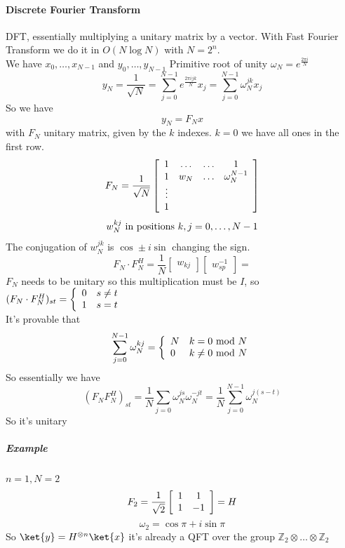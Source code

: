 \documentclass[10pt]{report}
\begin{document}
\paragraph{Discrete Fourier Transform} DFT, essentially multiplying a unitary matrix by a vector. With Fast Fourier Transform we do it in $O(N\log N)$ with $N = 2^n$.\\
We have $x_0,\ldots,x_{N-1}$ and $y_0,\ldots,y_{N-1}$ 
Primitive root of unity $\omega_N = e^{\frac{2\pi i}{N}}$
$$y_N = \frac{1}{\sqrt{N}} = \sum_{j=0}^{N-1} e^{\frac{2\pi ijk}{N}}x_j= \sum_{j=0}^{N-1} \omega_N^{jk}x_j$$
So we have $$y_N = F_N x$$ with $F_N$ unitary matrix, given by the $k$ indexes. $k=0$ we have all ones in the first row.
$$F_N = \frac{1}{\sqrt{N}}\left[\begin{array}{c c c c}
1 & \ldots & \ldots & 1\\
1 & w_N & \ldots & \omega_N^{N-1}\\
\vdots\\
1
\end{array}\right]$$
$$w_N^{kj}\hbox{ in positions }k,j=0,\ldots,N-1$$
The conjugation of $w_N^{jk}$ is $\cos \pm i\sin$ changing the sign.
$$F_N\cdot F_N^H = \frac{1}{N}\left[\begin{array}{c}
w_{kj}
\end{array}\right]\left[\begin{array}{c}
w_{sp}^{-1}
\end{array}\right] = $$
$F_N$ needs to be unitary so this multiplication must be $I$, so $(F_N\cdot F_N^H)_{st}=\left\{\begin{array}{l l}
0&s\neq t\\
1&s = t
\end{array}\right.$\\
It's provable that $$\sum_{j=0}^{N-1}\omega_N^{kj}=\left\{\begin{array}{l l}
N&k= 0\hbox{ mod }N\\
0&k\neq 0\hbox{ mod }N
\end{array}\right.$$
So essentially we have $$(F_NF_N^H)_{st} = \frac{1}{N}\sum_{j=0}\omega_N^{js}\omega_N^{-jt}= \frac{1}{N}\sum_{j=0}^{N-1}\omega_N^{j(s-t)}$$
So it's unitary
\subparagraph{Example} $n=1, N=2$ $$F_2=\frac{1}{\sqrt{2}}\left[\begin{array}{c c}
1&1\\1&-1
\end{array}\right] = H$$
$$\omega_2 = \cos\pi + i\sin\pi$$
So $\ket{y} = H^{\otimes n}\ket{x}$ it's already a QFT over the group $\mathbb{Z}_2\otimes\ldots\otimes\mathbb{Z}_2$
\end{document}
